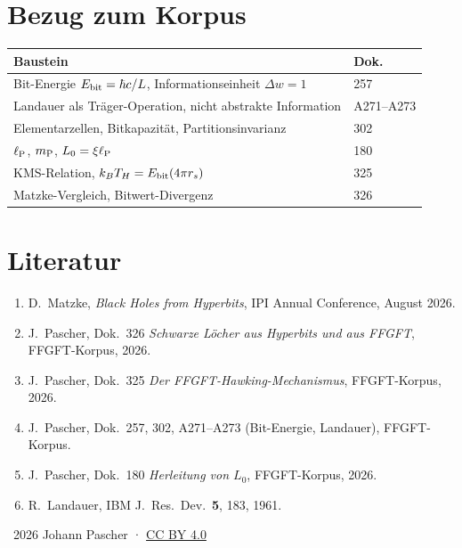 \section*{Bezug zum Korpus}

\begin{center}
\begin{tabular}{@{}ll@{}}
  \toprule
  \textbf{Baustein} & \textbf{Dok.} \\
  \midrule
  Bit-Energie $E_{\mathrm{bit}} = \hbar c/L$, Informationseinheit $\Delta w = 1$ & 257 \\
  Landauer als Träger-Operation, nicht abstrakte Information & A271--A273 \\
  Elementarzellen, Bitkapazität, Partitionsinvarianz & 302 \\
  $\ell_{\mathrm{P}}$, $m_{\mathrm{P}}$, $L_0 = \xi\ell_{\mathrm{P}}$ & 180 \\
  KMS-Relation, $k_BT_H = E_{\mathrm{bit}}(4\pi r_s)$ & 325 \\
  Matzke-Vergleich, Bitwert-Divergenz & 326 \\
  \bottomrule
\end{tabular}
\end{center}

\section*{Literatur}

\begin{enumerate}
  \item D.~Matzke, \textit{Black Holes from Hyperbits},
    IPI Annual Conference, August 2026.
  \item J.~Pascher, Dok.~326 \textit{Schwarze Löcher aus Hyperbits und
    aus FFGFT}, FFGFT-Korpus, 2026.
  \item J.~Pascher, Dok.~325 \textit{Der FFGFT-Hawking-Mechanismus},
    FFGFT-Korpus, 2026.
  \item J.~Pascher, Dok.~257, 302, A271--A273 (Bit-Energie, Landauer),
    FFGFT-Korpus.
  \item J.~Pascher, Dok.~180 \textit{Herleitung von $L_0$},
    FFGFT-Korpus, 2026.
  \item R.~Landauer, IBM J.\ Res.\ Dev.\ \textbf{5}, 183, 1961.
\end{enumerate}

\vspace{6pt}\noindent\small
\textcopyright\ 2026 Johann Pascher ·
\href{https://creativecommons.org/licenses/by/4.0/}{CC BY 4.0}
